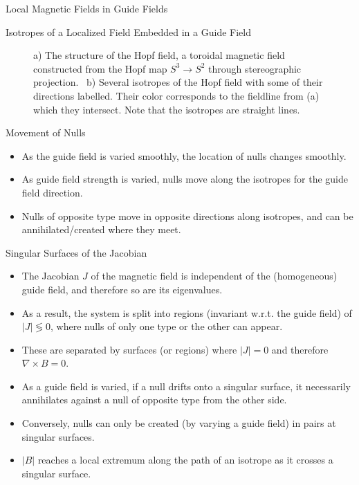 \documentclass[final]{beamer}
\newlength{\onecolwid}
\begin{document}
\begin{frame}[t]
\begin{columns}[t]
\begin{column}{\onecolwid}
\begin{block}{\huge{Local Magnetic Fields in Guide Fields}}
\begin{block}{Isotropes of a Localized Field Embedded in a Guide Field}
\begin{figure}
\begin{subfigure}[b]{.42\textwidth}
      \caption{}
    \end{subfigure}
    \caption{
      a) The structure of the Hopf field, a toroidal magnetic field
      constructed from the Hopf map $S^3\rightarrow S^2$ through stereographic projection.~\cite{smiet2017hopf}
      b) Several isotropes of the Hopf field with some of their directions labelled.
      Their color corresponds to the fieldline from (a) which they intersect.
      Note that the isotropes are straight lines.
    }
  \end{figure}
\end{block}

\begin{block}{Movement of Nulls}
  \begin{itemize}
    \item As the guide field is varied smoothly, the location of nulls changes smoothly.
    \item As guide field strength is varied, nulls move along the isotropes for the guide field direction.
    \item Nulls of opposite type move in opposite directions along isotropes,
      and can be annihilated/created where they meet.
  \end{itemize}
\end{block}

\begin{block}{Singular Surfaces of the Jacobian}
  \begin{itemize}
    \item The Jacobian $J$ of the magnetic field is independent of the (homogeneous) guide field,
      and therefore so are its eigenvalues.
    \item As a result, the system is split into regions (invariant w.r.t. the guide field) of $|J|\lessgtr 0$,
      where nulls of only one type or the other can appear.
    \item These are separated by surfaces (or regions) where $|J|=0$ and therefore $\nabla\times B=0$.
    \item As a guide field is varied, if a null drifts onto a singular surface, it necessarily annihilates
      against a null of opposite type from the other side.
    \item Conversely, nulls can only be created (by varying a guide field) in pairs at singular surfaces.
    \item $|B|$ reaches a local extremum along the path of an isotrope as it crosses a singular surface.
    \end{itemize}
\end{block}


\end{block}
\end{column}
\end{columns}
\end{frame}
\end{document}
